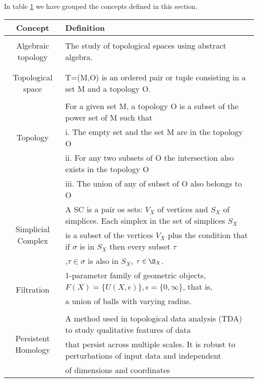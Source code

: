 \documentclass[onecollarge,runningheads]{svjour2}
\begin{document}

In table \ref{table:table} we have grouped the concepts defined in this section.
\begin{table}[htbp]
\begin{center}
\begin{tabular}{|c|l|}
\hline
 Concept & Definition\\ \hline
\multirow{3}{*}{Algebraic topology}
 & {} \\
 & {The study of topological spaces using abstract algebra.}  \\
 & {} \\
 \hline
\multirow{3}{*}{Topological space}
 & { } \\
 & {T=(M,O) is an ordered pair or tuple consisting in a set M and a topology O.}  \\
 & \\
 \hline
 \multirow{3}{*}{Topology}
 & {For a given set M, a topology O is a subset of the power set of M such that} \\
 & {i. The empty set and the set M are in the topology O }  \\
 & {ii. For any two subsets of O the intersection also exists in the topology O } \\
 & {iii. The union of any of subset of O also belongs to O} \\
 \hline
\multirow{3}{*}{Simplicial Complex}
 & {A SC is a pair os sets: $V_X$ of vertices and $S_X$ of simplices. Each simplex in the set of simplices $S_X$ }  \\
 & {is a subset of the vertices $V_X$ plus the condition that if $\sigma$ is in $S_X$ then every subset $\tau$ }  \\
 & ,$\tau \in \sigma$ is also in $S_X$, $\tau \in \S_X$.\\
 \hline
  \multirow{3}{*}{Filtration}
 & {1-parameter family of geometric objects, $F(X) = \{U(X, \epsilon)\}, \epsilon = \{ 0, \infty\}$, that is, }  \\
 & {a union of balls with varying radius.}  \\
 & \\
 \hline\multirow{3}{*}{Persistent Homology}
 & {A method used in topological data analysis (TDA) to study qualitative features of data }  \\
 & {that persist across multiple scales. It is robust to perturbations of input data and  independent}  \\
 & {of dimensions and coordinates} \\
 \hline
\end{tabular}
\label{table:table}
\end{center}
\end{table}
\end{document}
